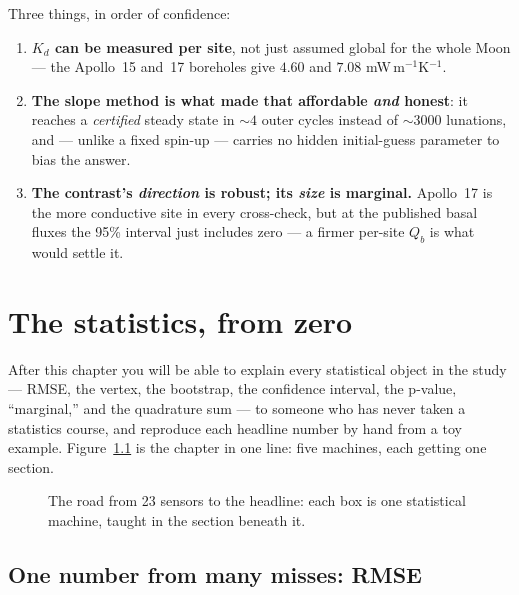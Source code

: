 \documentclass[11pt]{report}
\begin{document}
\begin{keypt}[title={What to take away}]
Three things, in order of confidence:
\begin{enumerate}[leftmargin=1.5em,itemsep=1pt]
\item \textbf{$K_d$ can be measured per site}, not just assumed global for the
  whole Moon --- the Apollo~15 and~17 boreholes give $4.60$ and $7.08$
  mW\,m$^{-1}$K$^{-1}$.
\item \textbf{The slope method is what made that affordable \emph{and} honest}:
  it reaches a \emph{certified} steady state in ${\sim}4$ outer cycles instead of
  ${\sim}3000$ lunations, and --- unlike a fixed spin-up --- carries no hidden
  initial-guess parameter to bias the answer.
\item \textbf{The contrast's \emph{direction} is robust; its \emph{size} is
  marginal.} Apollo~17 is the more conductive site in every cross-check, but at
  the published basal fluxes the 95\% interval just includes zero --- a firmer
  per-site $Q_b$ is what would settle it.
\end{enumerate}
\end{keypt}

\chapter{The statistics, from zero}\label{ch:statszero}

After this chapter you will be able to explain every statistical object in the
study --- RMSE, the vertex, the bootstrap, the confidence interval, the
p-value, ``marginal,'' and the quadrature sum --- to someone who has never
taken a statistics course, and reproduce each headline number by hand from a
toy example. Figure~\ref{fig:statsflow} is the chapter in one line: five
machines, each getting one section.

\begin{figure}[htbp]\centering

\caption{The road from 23 sensors to the headline: each box is one
statistical machine, taught in the section beneath it.}
\label{fig:statsflow}
\end{figure}

\section{One number from many misses: RMSE}\label{sec:rmsezero}
\end{document}
